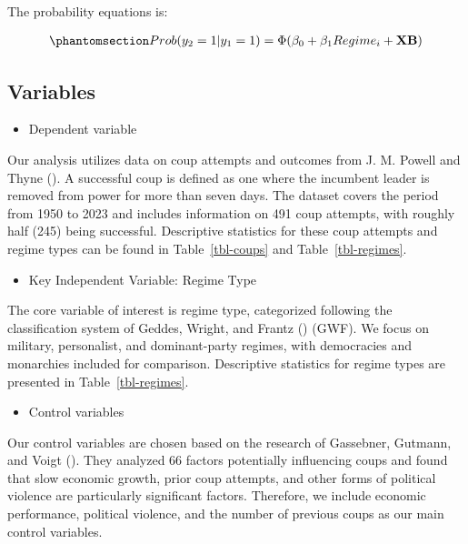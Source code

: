 \documentclass[
  12pt,
]{report}
\providecommand{\tightlist}{%
  \setlength{\itemsep}{0pt}\setlength{\parskip}{0pt}}\usepackage{longtable,booktabs,array}
\begin{document}
The probability equations is:

\begin{equation}\phantomsection\label{eq-eq5a}{
\begin{aligned}
Prob(y_2=1|y_1 =1)=\Phi(\beta_0 + \beta_1 Regime_i + \mathbf{XB})
\end{aligned}
}\end{equation}

\subsection{Variables}\label{variables}

\begin{itemize}
\tightlist
\item
  Dependent variable
\end{itemize}

Our analysis utilizes data on coup attempts and outcomes from J. M.
Powell and Thyne (). A successful coup is
defined as one where the incumbent leader is removed from power for more
than seven days. The dataset covers the period from 1950 to 2023 and
includes information on 491 coup attempts, with roughly half (245) being
successful. Descriptive statistics for these coup attempts and regime
types can be found in Table~\ref{tbl-coups} and Table~\ref{tbl-regimes}.

\begin{itemize}
\tightlist
\item
  Key Independent Variable: Regime Type
\end{itemize}

The core variable of interest is regime type, categorized following the
classification system of Geddes, Wright, and Frantz
() (GWF). We focus on military,
personalist, and dominant-party regimes, with democracies and monarchies
included for comparison. Descriptive statistics for regime types are
presented in Table~\ref{tbl-regimes}.

\begin{itemize}
\tightlist
\item
  Control variables
\end{itemize}

Our control variables are chosen based on the research of Gassebner,
Gutmann, and Voigt (). They analyzed
66 factors potentially influencing coups and found that slow economic
growth, prior coup attempts, and other forms of political violence are
particularly significant factors. Therefore, we include economic
performance, political violence, and the number of previous coups as our
main control variables.
\end{document}
